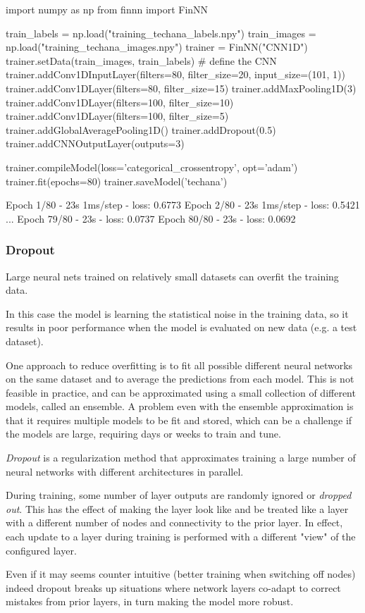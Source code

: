 \begin{ipython}
import numpy as np
from finnn import FinNN

train_labels = np.load("training_techana_labels.npy")
train_images = np.load("training_techana_images.npy")
trainer = FinNN("CNN1D")
trainer.setData(train_images, train_labels)
# define the CNN
trainer.addConv1DInputLayer(filters=80, filter_size=20,
input_size=(101, 1))
trainer.addConv1DLayer(filters=80, filter_size=15)
trainer.addMaxPooling1D(3)
trainer.addConv1DLayer(filters=100, filter_size=10)
trainer.addConv1DLayer(filters=100, filter_size=5)
trainer.addGlobalAveragePooling1D()
trainer.addDropout(0.5)
trainer.addCNNOutputLayer(outputs=3)

trainer.compileModel(loss='categorical_crossentropy', opt='adam')
trainer.fit(epochs=80)
trainer.saveModel('techana')
\end{ipython}
\begin{ioutput}
Epoch 1/80
- 23s 1ms/step - loss: 0.6773
Epoch 2/80
- 23s 1ms/step - loss: 0.5421
...
Epoch 79/80
- 23s - loss: 0.0737
Epoch 80/80
- 23s - loss: 0.0692
\end{ioutput}

\begin{attention}
\subsubsection{Dropout}

Large neural nets trained on relatively small datasets can overfit the
training data.

In this case the model is learning the statistical noise in the training data, so it results in poor performance when the model is evaluated on new data (e.g. a test dataset).

One approach to reduce overfitting is to fit all possible different neural networks on the same dataset and to average the predictions from each model. This is not feasible in practice, and can be approximated using a small collection of different models, called an ensemble. A problem even with the ensemble approximation is that it requires multiple models to be fit and stored, which can be a challenge if the models are large, requiring days or weeks to train and tune.

\emph{Dropout} is a regularization method that approximates training a large number of neural networks with different architectures in parallel.

During training, some number of layer outputs are randomly ignored or \emph{dropped out}. This has the effect of making the layer look like and be treated like a layer with a different number of nodes and connectivity to the prior layer. In effect, each update to a layer during training is performed with a different "view" of the configured layer.

Even if it may seems counter intuitive (better training when switching off nodes) indeed dropout breaks up situations where network layers co-adapt to correct mistakes from prior layers, in turn making the model more robust.
\end{attention}

